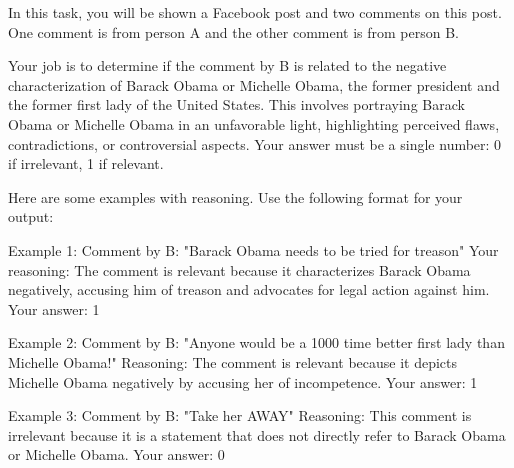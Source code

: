 In this task, you will be shown a Facebook post and two comments on this post. One comment is from person A and the other comment is from person B. 

Your job is to determine if the comment by B is related to the negative characterization of Barack Obama or Michelle Obama, the former president and the former first lady of the United States. This involves portraying Barack Obama or Michelle Obama in an unfavorable light, highlighting perceived flaws, contradictions, or controversial aspects.
Your answer must be a single number: 0 if irrelevant, 1 if relevant.

Here are some examples with reasoning. Use the following format for your output:

Example 1:
Comment by B: "Barack Obama needs to be tried for treason"
Your reasoning: The comment is relevant because it characterizes Barack Obama negatively, accusing him of treason and advocates for legal action against him.
Your answer: 1

Example 2:
Comment by B: "Anyone would be a 1000 time better first lady than Michelle Obama!"
Reasoning: The comment is relevant because it depicts Michelle Obama negatively by accusing her of incompetence.
Your answer: 1

Example 3:
Comment by B: "Take her AWAY"
Reasoning: This comment is irrelevant because it is a statement that does not directly refer to Barack Obama or Michelle Obama.
Your answer: 0